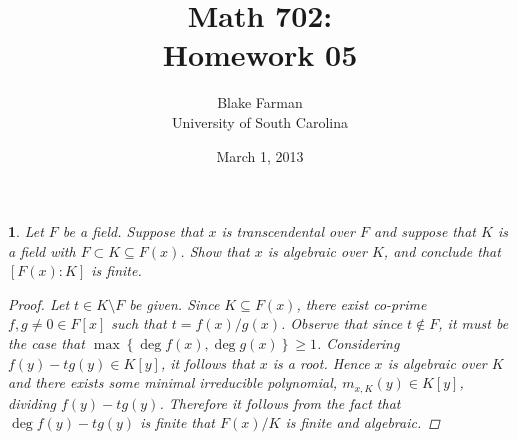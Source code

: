 \documentclass[10pt]{amsart}
\author{Blake Farman\\University of South Carolina}
\title{Math 702:\\Homework 05}
\date{March 1, 2013}
\begin{document}
\maketitle

\providecommand{\p}{\mathfrak{p}}
\providecommand{\m}{\mathfrak{m}}

\newtheorem{thm}{}
\newtheorem{lem}{Lemma}

\newcommand{\End}[2]{\operatorname{End}_{#1}\left(#2\right)}
\newcommand{\Hom}[2]{\operatorname{Hom}_{#1}\left(#2\right)}

\begin{thm}
  Let $F$ be a field.
  Suppose that $x$ is transcendental over $F$ and suppose that $K$ is a field with $F \subset K \subseteq F(x)$.
  Show that $x$ is algebraic over $K$, and conclude that $[F(x) : K]$ is finite.
  
  \begin{proof}
    Let $t \in K \setminus F$ be given.
    Since $K \subseteq F(x)$, there exist co-prime $f, g \neq 0 \in F[x]$ such that $t = f(x) / g(x)$.
    Observe that since $t \not \in F$, it must be the case that $\max\left\{\deg{f(x)}, \deg{g(x)}\right\} \geq 1$.
    Considering $f(y) - tg(y) \in K[y]$, it follows that $x$ is a root.
    Hence $x$ is algebraic over $K$ and there exists some minimal irreducible polynomial, $m_{x,K}(y) \in K[y]$, dividing $f(y) - tg(y)$.
    Therefore it follows from the fact that $\deg{f(y) - tg(y)}$ is finite that $F(x)/K$ is finite and algebraic.
  \end{proof}
\end{thm}
\end{document}
